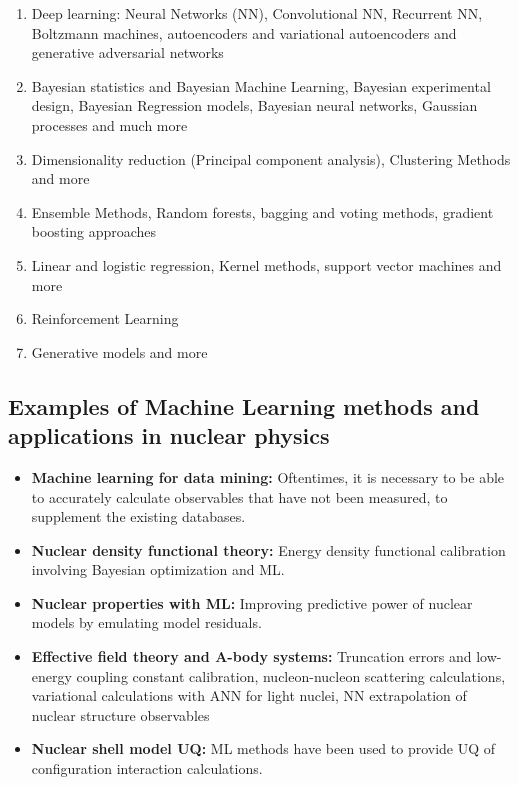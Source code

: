 \documentclass[%
oneside,                 %
final,                   %
10pt]{article}
\begin{document}
\begin{enumerate}
\item Deep learning: Neural Networks (NN), Convolutional NN, Recurrent NN, Boltzmann machines, autoencoders and variational autoencoders  and generative adversarial networks 

\item Bayesian statistics and Bayesian Machine Learning, Bayesian experimental design, Bayesian Regression models, Bayesian neural networks, Gaussian processes and much more

\item Dimensionality reduction (Principal component analysis), Clustering Methods and more

\item Ensemble Methods, Random forests, bagging and voting methods, gradient boosting approaches 

\item Linear and logistic regression, Kernel methods, support vector machines and more

\item Reinforcement Learning 

\item Generative models and more
\end{enumerate}

\noindent
\subsection{Examples of Machine Learning methods and applications in nuclear physics}

\begin{block}{}
\begin{itemize}
\item \textbf{Machine  learning  for  data  mining:} Oftentimes,  it  is necessary to be able to accurately calculate observables that have not been measured, to supplement the existing databases.

\item \textbf{Nuclear  density  functional   theory:} Energy density functional calibration   involving Bayesian optimization  and ML.

\item \textbf{Nuclear properties with ML:} Improving predictive power of nuclear models by emulating model residuals.

\item \textbf{Effective field theory and A-body systems:} Truncation errors and low-energy coupling constant calibration, nucleon-nucleon scattering calculations, variational calculations with ANN for light nuclei, NN extrapolation of nuclear structure observables

\item \textbf{Nuclear  shell  model  UQ:} ML methods  have  been  used  to  provide  UQ  of  configuration  interaction  calculations.
\end{itemize}

\noindent
\end{block}
\end{document}
